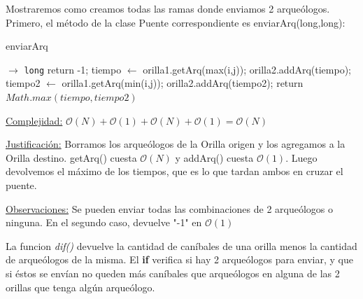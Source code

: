 Mostraremos como creamos todas las ramas donde enviamos 2 arqueólogos. Primero, el m\'etodo de la clase Puente correspondiente es enviarArq(long,long):

\begin{algorithm}[H]
\caption{enviarArq}
\begin{algorithmic}[1]
     $\to $ \texttt{long}
            \State	return -1;
        \EndIf
		\State tiempo $\leftarrow$ orilla1.getArq(max(i,j));
		\State orilla2.addArq(tiempo);
		\State tiempo2 $\leftarrow$ orilla1.getArq(min(i,j));
		\State orilla2.addArq(tiempo2);
	    \State \State return $Math.max(tiempo, tiempo2)$
    \EndProcedure
\end{algorithmic}
\underline{Complejidad:}
$\mathcal{O}(N) + \mathcal{O}(1) + \mathcal{O}(N) + \mathcal{O}(1) = \mathcal{O}(N)$

\vspace*{5mm}
\underline{Justificación:} Borramos los arque\'ologos de la Orilla origen y los agregamos a la Orilla destino. getArq() cuesta $\mathcal{O}(N)$ y addArq() cuesta $\mathcal{O}(1)$. Luego devolvemos el m\'aximo de los tiempos, que es lo que tardan ambos en cruzar el puente.


\underline{Observaciones:} Se pueden enviar todas las combinaciones de 2 arque\'ologos o ninguna. En el segundo caso, devuelve "-1" en $\mathcal{O}(1)$
\end{algorithm}

La funcion \textit{dif()} devuelve la cantidad de can\'ibales de una orilla menos la cantidad de arque\'ologos de la misma. El \textbf{if} verifica si hay 2 arque\'ologos para enviar, y que si \'estos se env\'ian no queden m\'as can\'ibales que arque\'ologos en alguna de las 2 orillas que tenga alg\'un arque\'ologo.


